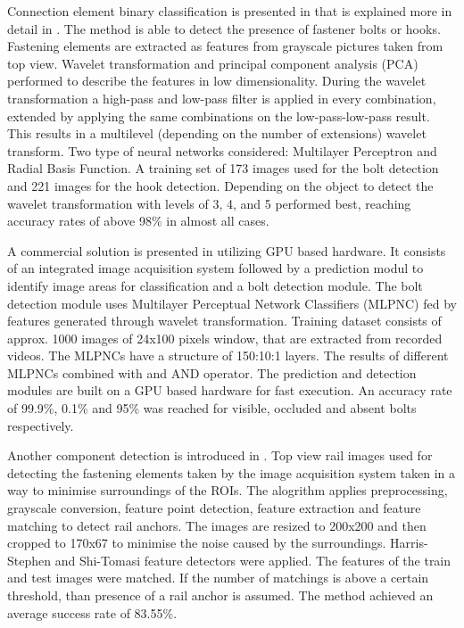 \documentclass[10pt, final]{article}
\begin{document}
			Connection element binary classification is presented in \cite{mazzeo_visual_2004} that is explained more
			in detail in \cite{marino_real-time_2007}. 
			The method is able to detect the presence of fastener bolts or hooks.
			Fastening elements are extracted as features from grayscale pictures taken from top view.
			Wavelet transformation and principal component analysis (PCA) performed to describe the features
			in low dimensionality.
			During the wavelet transformation a high-pass and low-pass filter is applied in every combination,
			extended by applying the same combinations on the low-pass-low-pass result.
			This results in a multilevel (depending on the number of extensions) wavelet transform.
			Two type of neural networks considered: Multilayer Perceptron and Radial Basis Function.
			A training set of 173 images used for the bolt detection and 221 images for the hook detection.
			Depending on the object to detect the wavelet transformation with levels of 3, 4, and 5 performed best,
			reaching accuracy rates of above 98\% in almost all cases.

			A commercial solution is presented in \cite{de_ruvo_gpu-based_2009} utilizing GPU based hardware.
			It consists of an integrated image acquisition system followed by a prediction modul to identify image areas 
			for classification and a bolt detection module.
			The bolt detection module uses Multilayer Perceptual Network Classifiers (MLPNC) fed by features generated 
			through wavelet transformation.
			Training dataset consists of approx. 1000 images of 24x100 pixels window, that are extracted from recorded
			videos.
			The MLPNCs have a structure of 150:10:1 layers.
			The results of different MLPNCs combined with and AND operator.
			The prediction and detection modules are built on a GPU based hardware for fast execution.
			An accuracy rate of 99.9\%, 0.1\% and 95\% was reached for visible, occluded and absent bolts
			respectively.

			Another component detection is introduced in \cite{khan_automatic_2014}.
			Top view rail images used for detecting the fastening elements taken by the image acquisition system
			taken in a way to minimise surroundings of the ROIs.
			The alogrithm applies preprocessing, grayscale conversion, feature point detection, feature extraction 
			and feature matching to detect rail anchors.
			The images are resized to 200x200 and then cropped to 170x67 to minimise the noise caused by the surroundings.
			Harris-Stephen and Shi-Tomasi feature detectors were applied.
			The features of the train and test images were matched.
			If the number of matchings is above a certain threshold, than presence of a rail anchor is assumed.
			The method achieved an average success rate of 83.55\%.
\end{document}
